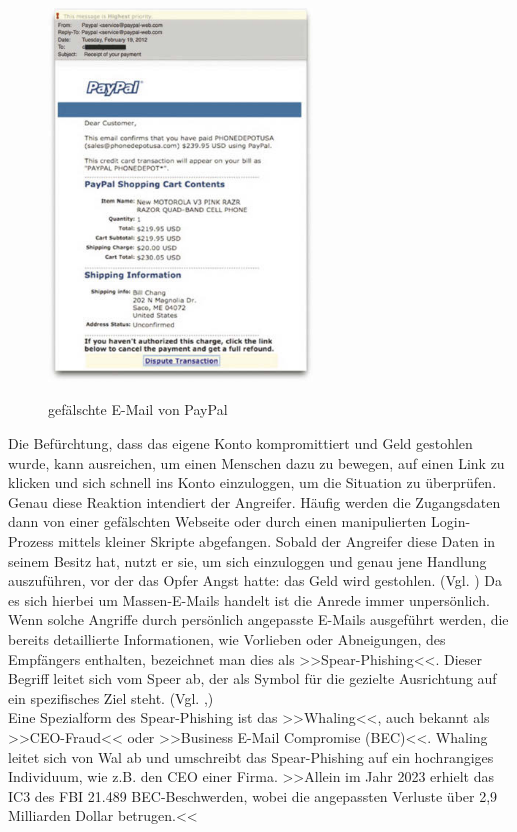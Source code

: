 \begin{figure}[h]
    \centering
\includegraphics[width = 7cm]{figures/ChristopherHadn_2014_Kapitel2WasIstSocialE_SocialEngineeringEntt.jpg}
\caption{gefälschte E-Mail von PayPal}
\cite{GrundformenDesSE}
\label{fig:PhishingPayPal}
\end{figure}

Die Befürchtung, dass das eigene Konto kompromittiert und Geld gestohlen wurde, kann ausreichen, um einen Menschen dazu zu bewegen, auf einen Link zu klicken und sich schnell ins Konto einzuloggen, um die Situation zu überprüfen. Genau diese Reaktion intendiert der Angreifer. Häufig werden die Zugangsdaten dann von einer gefälschten Webseite oder durch einen manipulierten Login-Prozess mittels kleiner Skripte abgefangen. Sobald der Angreifer diese Daten in seinem Besitz hat, nutzt er sie, um sich einzuloggen und genau jene Handlung auszuführen, vor der das Opfer Angst hatte: das Geld wird gestohlen. (Vgl. \cite{phishing}) Da es sich hierbei um Massen-E-Mails handelt ist die Anrede immer unpersönlich. \\
Wenn solche Angriffe durch persönlich angepasste E-Mails ausgeführt werden, die bereits detaillierte Informationen, wie Vorlieben oder Abneigungen, des Empfängers enthalten, bezeichnet man dies als >>Spear-Phishing<<. Dieser Begriff leitet sich vom Speer ab, der als Symbol für die gezielte Ausrichtung auf ein spezifisches Ziel steht. (Vgl. \cite{spear},\cite{phishing})\\
Eine Spezialform des Spear-Phishing ist das >>Whaling<<, auch bekannt als >>CEO-Fraud<< oder >>Business E-Mail Compromise (BEC)<<. Whaling leitet sich von Wal ab und umschreibt das Spear-Phishing auf ein hochrangiges Individuum, wie z.B. den CEO einer Firma. >>Allein im Jahr 2023 erhielt das IC3 des FBI 21.489 BEC-Beschwerden, wobei die angepassten Verluste über 2,9 Milliarden Dollar betrugen.<<\cite[frei übersetzt]{fbi}


